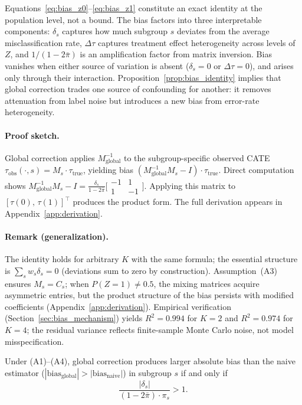 Equations~\eqref{eq:bias_z0}--\eqref{eq:bias_z1} constitute an exact identity at the population level, not a bound.
The bias factors into three interpretable components: $\delta_s$ captures how much subgroup $s$ deviates from the average misclassification rate, $\Delta\tau$ captures treatment effect heterogeneity across levels of $Z$, and $1/(1 - 2\bar{\pi})$ is an amplification factor from matrix inversion.
Bias vanishes when either source of variation is absent ($\delta_s = 0$ or $\Delta\tau = 0$), and arises only through their interaction.
Proposition~\ref{prop:bias_identity} implies that global correction trades one source of confounding for another: it removes attenuation from label noise but introduces a new bias from error-rate heterogeneity.

\paragraph{Proof sketch.}
Global correction applies $M_{\text{global}}^{-1}$ to the subgroup-specific observed CATE $\tau_{\text{obs}}(\cdot, s) = M_s \cdot \tau_{\text{true}}$, yielding bias $(M_{\text{global}}^{-1} M_s - I) \cdot \tau_{\text{true}}$.
Direct computation shows $M_{\text{global}}^{-1} M_s - I = \frac{\delta_s}{1-2\bar{\pi}} \bigl[\begin{smallmatrix} -1 & 1 \\ 1 & -1 \end{smallmatrix}\bigr]$.
Applying this matrix to $[\tau(0),\, \tau(1)]^\top$ produces the product form.
The full derivation appears in Appendix~\ref{app:derivation}.

\paragraph{Remark (generalization).}
The identity holds for arbitrary $K$ with the same formula; the essential structure is $\sum_s w_s \delta_s = 0$ (deviations sum to zero by construction).
Assumption~(A3) ensures $M_s = C_s$; when $P(Z{=}1) \neq 0.5$, the mixing matrices acquire asymmetric entries, but the product structure of the bias persists with modified coefficients (Appendix~\ref{app:derivation}).
Empirical verification (Section~\ref{sec:bias_mechanism}) yields $R^2 = 0.994$ for $K{=}2$ and $R^2 = 0.974$ for $K{=}4$; the residual variance reflects finite-sample Monte Carlo noise, not model misspecification.

\begin{proposition}
\label{prop:debiasing_hurts}
Under \textnormal{(A1)--(A4)}, global correction produces larger absolute bias than the naive estimator ($|\mathrm{bias}_{\mathrm{global}}| > |\mathrm{bias}_{\mathrm{naive}}|$) in subgroup $s$ if and only if
\begin{equation}
\frac{|\delta_s|}{(1 - 2\bar{\pi}) \cdot \pi_s} > 1.
\label{eq:hurts_condition}
\end{equation}
\end{proposition}

